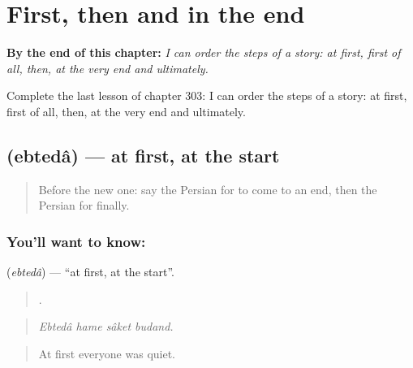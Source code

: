 
\chapter{First, then and in the end}
\label{ch:fa-first-then-and-in-the-end}

\begin{chapteropening}
\textbf{By the end of this chapter:} \emph{I can order the steps of a story: at first, first of all, then, at the very end and ultimately.}

Complete the last lesson of chapter 303: I can order the steps of a story: at first, first of all, then, at the very end and ultimately.
\end{chapteropening}

\section[\texorpdfstring{\fa{ابتدا} (ebtedâ)}{ابتدا (ebtedâ)}]{ (ebtedâ) — at first, at the start}

\label{lesson:FA-C303-ebteda}



\begin{quote}
Before the new one: say the Persian for to come to an end, then the Persian for finally.
\end{quote}

\subsection*{You'll want to know: }
\textbf{} (\emph{ebtedâ}) — \textquotedblleft{}at first, at the start\textquotedblright{}.

\begin{quote}
   .
\end{quote}

\begin{quote}
\emph{Ebtedâ hame sâket budand.}
\end{quote}

\begin{quote}
At first everyone was quiet.
\end{quote}


